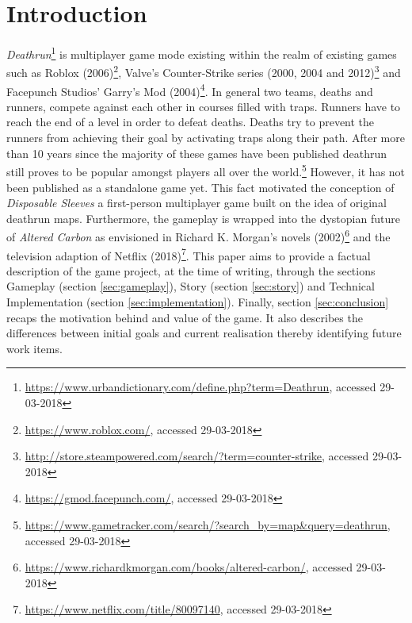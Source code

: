 \section{Introduction} \label{sec:introduction}

\emph{Deathrun}\footnote{\url{https://www.urbandictionary.com/define.php?term=Deathrun}, accessed 29-03-2018} is multiplayer game mode existing within the realm of existing games such as Roblox (2006)\footnote{\url{https://www.roblox.com/}, accessed 29-03-2018}, Valve's Counter-Strike series (2000, 2004 and 2012)\footnote{\url{http://store.steampowered.com/search/?term=counter-strike}, accessed 29-03-2018} and Facepunch Studios' Garry's Mod (2004)\footnote{\url{https://gmod.facepunch.com/}, accessed 29-03-2018}.
In general two teams, deaths and runners, compete against each other in courses filled with traps.
Runners have to reach the end of a level in order to defeat deaths.
Deaths try to prevent the runners from achieving their goal by activating traps along their path.
After more than 10 years since the majority of these games have been published deathrun still proves to be popular amongst players all over the world.\footnote{\url{https://www.gametracker.com/search/?search_by=map&query=deathrun}, accessed 29-03-2018}
However, it has not been published as a standalone game yet.
This fact motivated the conception of \emph{Disposable Sleeves} a first-person multiplayer game built on the idea of original deathrun maps.
Furthermore, the gameplay is wrapped into the dystopian future of \emph{Altered Carbon} as envisioned in Richard K. Morgan's novels (2002)\footnote{\url{https://www.richardkmorgan.com/books/altered-carbon/}, accessed 29-03-2018} and the television adaption of Netflix (2018)\footnote{\url{https://www.netflix.com/title/80097140}, accessed 29-03-2018}.
This paper aims to provide a factual description of the game project, at the time of writing, through the sections Gameplay (section \ref{sec:gameplay}), Story (section \ref{sec:story}) and Technical Implementation (section \ref{sec:implementation}).
Finally, section \ref{sec:conclusion} recaps the motivation behind and value of the game.
It also describes the differences between initial goals and current realisation thereby identifying future work items.